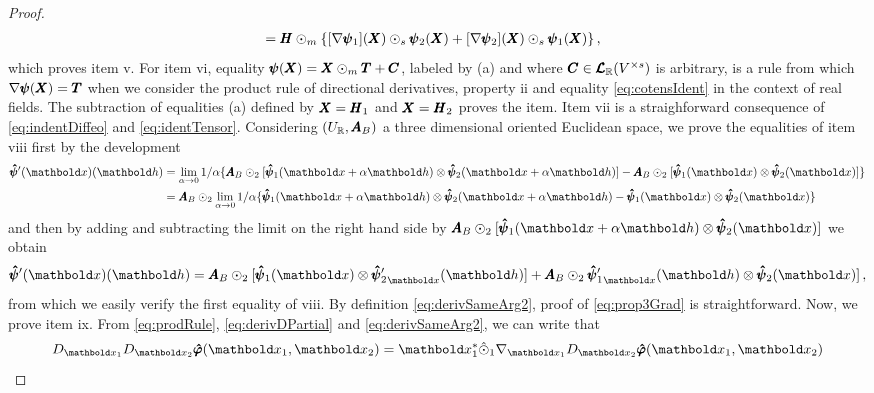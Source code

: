 {\begin{proof}
\begin{align*}
&=\pmb{H}\odot_m\{[\nabla\pmb{\psi}_1](\pmb{X})\odot_s\pmb{\psi}_2(\pmb{X})+[\nabla\pmb{\psi}_2](\pmb{X})\odot_s\pmb{\psi}_1(\pmb{X})\}\,,
\end{align*}
which proves item v. For item vi, equality $\pmb{\psi}(\pmb{X})=\pmb{X}\odot_m\pmb{T}+\pmb{C}$, labeled by (a) and where $\pmb{C}\in\pmb{\mathcal{L}}_{\mathbb{R}}(V^{\times s})$ is arbitrary, is a rule from which $\nabla\pmb{\psi}(\pmb{X})=\pmb{T}$ when we consider the product rule of directional derivatives, property ii and equality \eqref{eq:cotensIdent} in the context of real fields. The subtraction of equalities (a) defined by $\pmb{X}=\pmb{H}_1$ and $\pmb{X}=\pmb{H}_2$ proves the item. Item vii is a straighforward consequence of \eqref{eq:indentDiffeo} and \eqref{eq:identTensor}. Considering $(U_{\mathbb{R}},\pmb{A}_B)$ a three dimensional oriented Euclidean space, we prove the equalities of item viii first by the development
\begin{align*}
\fua{\tnr{\hat\psi}'(\vto{x})}{\vto{h}}&=\lim_{\alpha\to 0}1/\alpha\{\tnr{A}_B\odot_{2}[\fua{\tnr{\hat\psi}_1}{\vto{x}+\alpha\vto{h}}\otimes\fua{\tnr{\hat\psi}_2}{\vto{x}+\alpha\vto{h}}]-\tnr{A}_B\odot_{2}[\fua{\tnr{\hat\psi}_1}{\vto{x}}\otimes\fua{\tnr{\hat\psi}_2}{\vto{x}}]\}\\
&=\tnr{A}_B\odot_{2}\lim_{\alpha\to 0}1/\alpha\{\fua{\tnr{\hat\psi}_1}{\vto{x}+\alpha\vto{h}}\otimes\fua{\tnr{\hat\psi}_2}{\vto{x}+\alpha\vto{h}}-\fua{\tnr{\hat\psi}_1}{\vto{x}}\otimes\fua{\tnr{\hat\psi}_2}{\vto{x}}\}
\end{align*}
and then by adding and subtracting the limit on the right hand side by $\tnr{A}_B\odot_{2}[\fua{\tnr{\hat\psi}_1}{\vto{x}+\alpha\vto{h}}\otimes\fua{\tnr{\hat\psi}_2}{\vto{x}}]$ we obtain
\begin{equation*}
\fua{\tnr{\hat\psi}'(\vto{x})}{\vto{h}}= \tnr{A}_B\odot_{2}[\fua{\tnr{\hat\psi}_1}{\vto{x}}\otimes\fua{{\tnr{\hat\psi}_2'}_{\vto{x}}}{\vto{h}}]+\tnr{A}_B\odot_{2}\fua{{\tnr{\hat\psi}_1'}_{\vto{x}}}{\vto{h}} \otimes \fua{\tnr{\hat\psi}_2}{\vto{x}}]\,,
\end{equation*}
from which we easily verify the first equality of viii. By definition \eqref{eq:derivSameArg2}, proof of \eqref{eq:prop3Grad} is straightforward. Now, we prove item ix. From \eqref{eq:prodRule}, \eqref{eq:derivDPartial} and \eqref{eq:derivSameArg2}, we can write that
\begin{equation*}
D_{\vto{x}_1}D_{\vto{x}_2}\tnr{\hat{\varphi}}(\vto{x}_1,\vto{x}_2) = \vto{x}_1^*\hat{\odot}_1\fua{ \nabla_{\vto{x}_1}D_{\vto{x}_2}\tnr{\hat{\varphi}}}{\vto{x}_1,\vto{x}_2}

\end{equation*}
\end{proof}}
